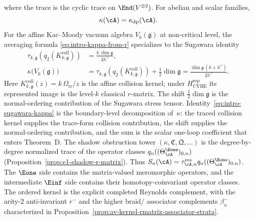 where the trace is the cyclic trace on $\End(V^{\otimes 2})$.
For abelian and scalar families,
\[
\kappa(\cA)=\kappa_{\mathrm{dp}}(\cA).
\]
For the affine Kac--Moody vacuum algebra $V_k(\mathfrak{g})$ at
non-critical level, the averaging formula
\eqref{eq:intro-kappa-from-r} specializes to the Sugawara identity
\begin{equation}\label{eq:intro-sugawara-kappa}
\begin{aligned}
\tau_{k,\mathfrak g}\!\left(
 q_2(K_{k,\mathfrak g}^{\mathrm{coll}})\right)
 &=\frac{k\,\dim\mathfrak g}{2h^\vee},\\
\kappa\bigl(V_k(\mathfrak{g})\bigr)
 &=\tau_{k,\mathfrak g}\!\left(
 q_2(K_{k,\mathfrak g}^{\mathrm{coll}})\right)
+\tfrac{1}{2}\dim\mathfrak{g}
=\frac{\dim\mathfrak{g}\,(k + h^\vee)}{2h^\vee}.
\end{aligned}
\end{equation}
Here $K_{k,\mathfrak g}^{\mathrm{coll}}(z)
=k\,\Omega_{\mathrm{tr}}/z$ is the affine collision kernel; under
$H_{\mathrm{CYBE}}^{\mathrm{rep}}$ its represented image is the
level-$k$ classical $r$-matrix.  The shift
$\tfrac{1}{2}\dim\mathfrak{g}$ is the normal-ordering contribution
of the Sugawara stress tensor.
Identity~\eqref{eq:intro-sugawara-kappa} is the boundary-level
decomposition of~$\kappa$: the traced collision kernel supplies the trace-form
collision contribution, the shift supplies the normal-ordering
contribution, and the sum is the scalar one-loop coefficient that
enters Theorem~D. The
shadow obstruction tower
$(\kappa, \mathfrak{C}, \mathfrak{Q}, \ldots)$ is the
degree-by-degree normalized trace of the operator classes
$q_n((\Theta_\cA^{\Eone})_{0,n})$
(Proposition~\ref{prop:e1-shadow-r-matrix}).  Thus
$S_n(\cA)=\tau_{\cA,n}^{\mathrm{res}}
q_n((\Theta_\cA^{\Eone})_{0,n})$.  The $\Eone$ side contains the
matrix-valued meromorphic operators, and the intermediate $\Einf$
side contains their homotopy-coinvariant operator classes. The ordered kernel is the
explicit completed Reynolds complement,
with the arity-$2$ anti-invariant $r^{-}$ and the higher braid/
associator complements $\beta_n^{-}$ characterized in
Proposition~\ref{prop:av-kernel-rmatrix-associator-strata}.

